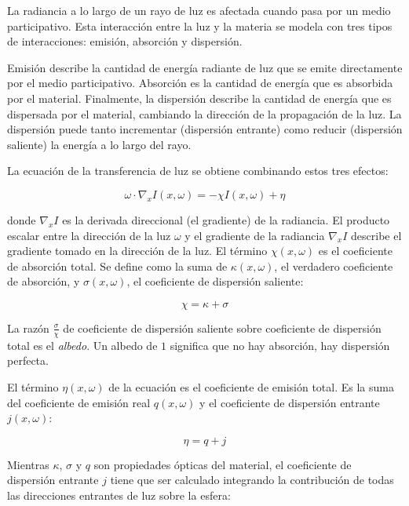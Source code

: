 La radiancia a lo largo de un rayo de luz es afectada cuando pasa por un medio participativo.
Esta interacción entre la luz y la materia se modela con tres tipos de interacciones: emisión, absorción y dispersión.

Emisión describe la cantidad de energía radiante de luz que se emite directamente por el medio participativo.
Absorción es la cantidad de energía que es absorbida por el material.
Finalmente, la dispersión describe la cantidad de energía que es dispersada por el material, cambiando la dirección de la propagación de la luz.
La dispersión puede tanto incrementar (dispersión entrante) como reducir (dispersión saliente) la energía a lo largo del rayo.

La ecuación de la transferencia de luz se obtiene combinando estos tres efectos:

\begin{equation}
    \omega \cdot \nabla_x I(x, \omega) = -\chi I(x, \omega) + \eta
\end{equation}

donde $\nabla_x I$ es la derivada direccional (el gradiente) de la radiancia.
El producto escalar entre la dirección de la luz $\omega$ y el gradiente de la radiancia $\nabla_x I$ describe el gradiente tomado en la dirección de la luz.
El término $\chi(x, \omega)$ es el coeficiente de absorción total.
Se define como la suma de $\kappa(x, \omega)$, el verdadero coeficiente de absorción, y $\sigma(x, \omega)$, el coeficiente de dispersión saliente:

\begin{equation}
    \chi = \kappa + \sigma
\end{equation}

La razón $\frac{\sigma}{\chi}$ de coeficiente de dispersión saliente sobre coeficiente de dispersión total es el \textit{albedo}.
Un albedo de $1$ significa que no hay absorción, hay dispersión perfecta.

El término $\eta(x, \omega)$ de la ecuación es el coeficiente de emisión total.
Es la suma del coeficiente de emisión real $q(x, \omega)$ y el coeficiente de dispersión entrante $j(x, \omega)$:

\begin{equation}
    \eta = q + j
\end{equation}

Mientras $\kappa$, $\sigma$ y $q$ son propiedades ópticas del material, el coeficiente de dispersión entrante $j$ tiene que ser calculado integrando la contribución de todas las direcciones entrantes de luz sobre la esfera:

